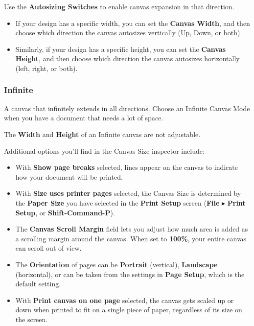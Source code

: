 \documentclass[../main.tex]{subfiles}
\begin{document}
Use the \textbf{Autosizing Switches} to enable canvas expansion in that direction.


\begin{itemize}
  \item If your design has a specific width, you can set the \textbf{Canvas Width}, and then
    choose which direction the canvas autosizes vertically (Up, Down, or both).
  \item Similarly, if your design has a specific height, you can set the \textbf{Canvas Height},
    and then choose which direction the canvas autosizes horizontally (left, right, or both).
\end{itemize}

\subsubsection{Infinite}

A canvas that infinitely extends in all directions. Choose an Infinite Canvas Mode when you have
a document that needs a lot of space.


\begin{ognote}
  The \textbf{Width} and \textbf{Height} of an Infinite canvas are not adjustable.
\end{ognote}

Additional options you'll find in the Canvas Size inspector include:

\begin{itemize}
  \item With \textbf{Show page breaks} selected, lines appear on the canvas to indicate how your
    document will be printed.
  \item With \textbf{Size uses printer pages} selected, the Canvas Size is determined by the
    \textbf{Paper Size} you have selected in the \textbf{Print Setup} screen (\textbf{File}
    $\blacktriangleright$ \textbf{Print Setup}, or \textbf{Shift-Command-P}).
  \item The \textbf{Canvas Scroll Margin} field lets you adjust how much area is added as a
    scrolling margin around the canvas. When set to \textbf{100\%}, your entire canvas can
    scroll out of view.
  \item The \textbf{Orientation} of pages can be \textbf{Portrait} (vertical),
    \textbf{Landscape} (horizontal), or can be taken from the settings in \textbf{Page Setup},
    which is the default setting.
  \item With \textbf{Print canvas on one page} selected, the canvas gets scaled up or down when
    printed to fit on a single piece of paper, regardless of its size on the screen.
\end{itemize}
\end{document}
